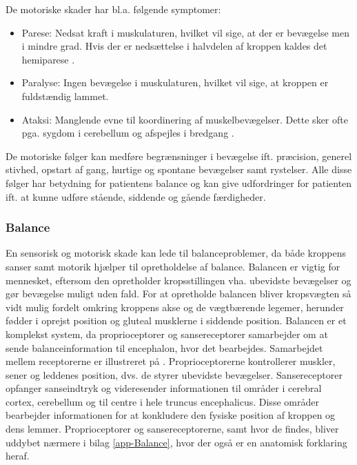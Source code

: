 \noindent De motoriske skader har bl.a. følgende symptomer:
\begin{itemize}
  \item Parese: Nedsat kraft i muskulaturen, hvilket vil sige, at der er bevægelse men i mindre grad. Hvis der er nedsættelse i halvdelen af kroppen kaldes det hemiparese \cite{Sundhed.dk2014a}.
  \item Paralyse: Ingen bevægelse i muskulaturen, hvilket vil sige, at kroppen er fuldstændig lammet. \cite{Vistrup2015}
  \item Ataksi: Manglende evne til koordinering af muskelbevægelser. Dette sker ofte pga. sygdom i cerebellum og afspejles i bredgang \cite{Redaktionen2015a}. 
\end{itemize}
De motoriske følger kan medføre begrænsninger i bevægelse ift. præcision, generel stivhed, opstart af gang, hurtige og spontane bevægelser samt rystelser. Alle disse følger har betydning for patientens balance og kan give udfordringer for patienten ift. at kunne udføre stående, siddende og gående færdigheder. \cite{Sundhed.dk,DSfA2009} \\

\subsubsection{Balance}
En sensorisk og motorisk skade kan lede til balanceproblemer, da både kroppens sanser samt motorik hjælper til opretholdelse af balance. Balancen er vigtig for mennesket, eftersom den opretholder kropsstillingen vha. ubevidste bevægelser og gør bevægelse muligt uden fald. For at opretholde balancen bliver kropsvægten så vidt mulig fordelt omkring kroppens akse og de vægtbærende legemer, herunder fødder i oprejst position og gluteal musklerne i siddende position. \cite{Nichols1997}
Balancen er et komplekst system, da proprioceptorer og sansereceptorer samarbejder om at sende balanceinformation til encephalon, hvor det bearbejdes. Samarbejdet mellem receptorerne er illustreret på . Proprioceptorerne kontrollerer muskler, sener og leddenes position, dvs. de styrer ubevidste bevægelser. \cite{Martini2012} Sansereceptorer opfanger sanseindtryk og videresender informationen til områder i cerebral cortex, cerebellum og til centre i hele truncus encephalicus. Disse områder bearbejder informationen for at konkludere den fysiske position af kroppen og dens lemmer. \cite{Martini2012,Karnath2003} Proprioceptorer og sansereceptorerne, samt hvor de findes, bliver uddybet nærmere i bilag \ref{app-Balance}, hvor der også er en anatomisk forklaring heraf.

